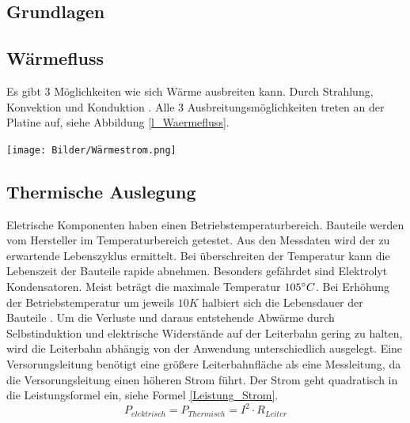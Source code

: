 \documentclass[10pt,a4paper,oneside,abstracton]{scrartcl}
\newenvironment{Figure}
  {\par\medskip\noindent\minipage{\linewidth}}
  {\endminipage\par\medskip}
\begin{document}
\begin{multicols}{2}
\section{Grundlagen}

\subsection{Wärmefluss}
Es gibt 3 Möglichkeiten 
wie sich Wärme ausbreiten kann. Durch Strahlung, Konvektion und Konduktion \cite{Waermefluss}. 
Alle 3 Ausbreitungsmöglichkeiten treten an der Platine auf, siehe Abbildung \ref*{l_Waermefluss}. 

\begin{Figure}
	\texttt{[image: Bilder/Wärmestrom.png]}
	\label{l_Waermefluss}
\end{Figure}

\subsection{Thermische Auslegung}
Eletrische Komponenten haben einen Betriebstemperaturbereich. 
Bauteile werden vom Hersteller im Temperaturbereich getestet. 
Aus den Messdaten wird der zu erwartende Lebenszyklus ermittelt.  
Bei überschreiten der Temperatur kann die Lebenszeit der Bauteile rapide abnehmen. 
Besonders gefährdet sind Elektrolyt Kondensatoren. 
Meist beträgt die maximale Temperatur $ 105 \degree C $. \newline 
Bei Erhöhung der Betriebstemperatur um jeweils $ 10K $ halbiert sich die Lebensdauer der Bauteile \cite{Elko}.
\newline
Um die Verluste und daraus entstehende Abwärme durch Selbstinduktion und elektrische Widerstände  auf der Leiterbahn gering zu halten,
wird die Leiterbahn abhängig von der Anwendung unterschiedlich ausgelegt.
\newline
Eine Versorungsleitung benötigt eine größere Leiterbahnfläche als eine Messleitung, da die Versorungsleitung einen höheren Strom führt. 
Der Strom geht quadratisch in die Leistungsformel ein, siehe Formel \ref*{Leistung_Strom}. 
\begin{equation}
	P_{elektrisch} = P_{Thermisch} =  I^2 \cdot R_{Leiter} 
	\label{Leistung_Strom}
\end{equation}


\end{multicols}
\end{document}
